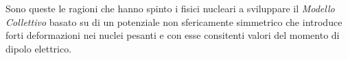 Sono queste le ragioni che hanno spinto i fisici nucleari a sviluppare il \emph{Modello Collettivo} basato su di un potenziale non sfericamente simmetrico che introduce forti deformazioni nei nuclei pesanti e con esse consitenti valori del momento di dipolo elettrico.


















































